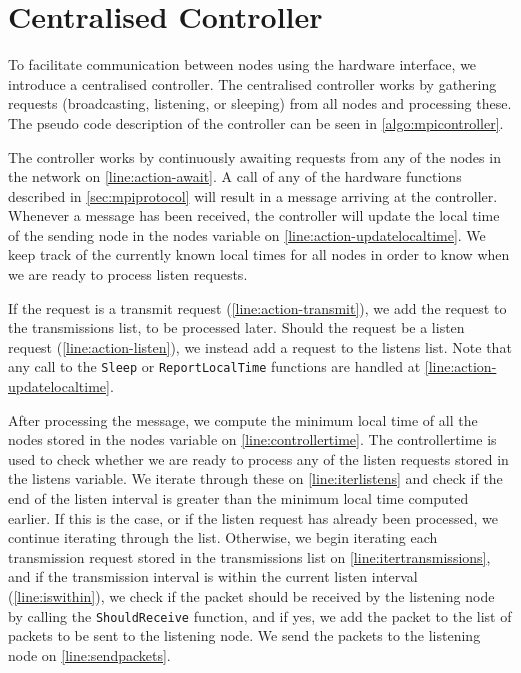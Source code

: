 \newpage
\section{Centralised Controller}\label{sec:mpicontroller}

To facilitate communication between nodes using the hardware interface, we introduce a centralised controller. The centralised controller works by gathering requests (broadcasting, listening, or sleeping) from all nodes and processing these. The pseudo code description of the controller can be seen in \autoref{algo:mpicontroller}.\medbreak

The controller works by continuously awaiting requests from any of the nodes in the network on \autoref{line:action-await}. A call of any of the hardware functions described in \autoref{sec:mpiprotocol} will result in a message arriving at the controller. Whenever a message has been received, the controller will update the local time of the sending node in the nodes variable on \autoref{line:action-updatelocaltime}. We keep track of the currently known local times for all nodes in order to know when we are ready to process listen requests. \smallbreak

If the request is a transmit request (\autoref{line:action-transmit}), we add the request to the transmissions list, to be processed later. Should the request be a listen request (\autoref{line:action-listen}), we instead add a request to the listens list. Note that any call to the \texttt{Sleep} or \texttt{ReportLocalTime} functions are handled at \autoref{line:action-updatelocaltime}.\smallbreak

After processing the message, we compute the minimum local time of all the nodes stored in the nodes variable on \autoref{line:controllertime}. The controllertime is used to check whether we are ready to process any of the listen requests stored in the listens variable. We iterate through these on \autoref{line:iterlistens} and check if the end of the listen interval is greater than the minimum local time computed earlier. If this is the case, or if the listen request has already been processed, we continue iterating through the list. Otherwise, we begin iterating each transmission request stored in the transmissions list on \autoref{line:itertransmissions}, and if the transmission interval is within the current listen interval (\autoref{line:iswithin}), we check if the packet should be received by the listening node by calling the \texttt{ShouldReceive} function, and if yes, we add the packet to the list of packets to be sent to the listening node. We send the packets to the listening node on \autoref{line:sendpackets}.\medbreak

